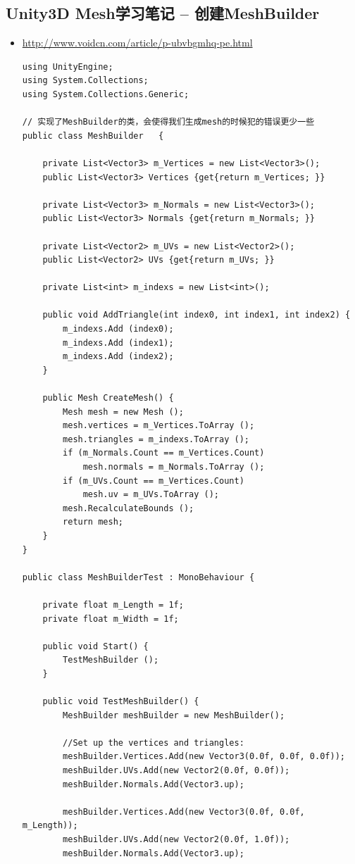 \documentclass[9pt, b5paper]{article}
\begin{document}
\subsection{Unity3D Mesh学习笔记 -- 创建MeshBuilder}
\label{sec:orgce630b1}
\begin{itemize}
\item \url{http://www.voidcn.com/article/p-ubvbgmhq-pe.html}
\begin{verbatim}
using UnityEngine;
using System.Collections;
using System.Collections.Generic;

// 实现了MeshBuilder的类，会使得我们生成mesh的时候犯的错误更少一些
public class MeshBuilder   {

	private List<Vector3> m_Vertices = new List<Vector3>();
	public List<Vector3> Vertices {get{return m_Vertices; }}

    private List<Vector3> m_Normals = new List<Vector3>();
	public List<Vector3> Normals {get{return m_Normals; }}

    private List<Vector2> m_UVs = new List<Vector2>();
	public List<Vector2> UVs {get{return m_UVs; }}

    private List<int> m_indexs = new List<int>();
	
	public void AddTriangle(int index0, int index1, int index2) {
        m_indexs.Add (index0);
        m_indexs.Add (index1);
        m_indexs.Add (index2);
    }

    public Mesh CreateMesh() {
        Mesh mesh = new Mesh ();
        mesh.vertices = m_Vertices.ToArray ();
        mesh.triangles = m_indexs.ToArray ();
        if (m_Normals.Count == m_Vertices.Count)
            mesh.normals = m_Normals.ToArray ();
        if (m_UVs.Count == m_Vertices.Count)
            mesh.uv = m_UVs.ToArray ();
        mesh.RecalculateBounds ();
        return mesh;
    }
}

public class MeshBuilderTest : MonoBehaviour {

	private float m_Length = 1f;
	private float m_Width = 1f;
	
	public void Start() {
        TestMeshBuilder ();
    }
	
	public void TestMeshBuilder() {
        MeshBuilder meshBuilder = new MeshBuilder();
		
        //Set up the vertices and triangles:
        meshBuilder.Vertices.Add(new Vector3(0.0f, 0.0f, 0.0f));
        meshBuilder.UVs.Add(new Vector2(0.0f, 0.0f));
        meshBuilder.Normals.Add(Vector3.up);
		
        meshBuilder.Vertices.Add(new Vector3(0.0f, 0.0f, m_Length));
        meshBuilder.UVs.Add(new Vector2(0.0f, 1.0f));
        meshBuilder.Normals.Add(Vector3.up);
		

\end{verbatim}
\end{itemize}
\end{document}
